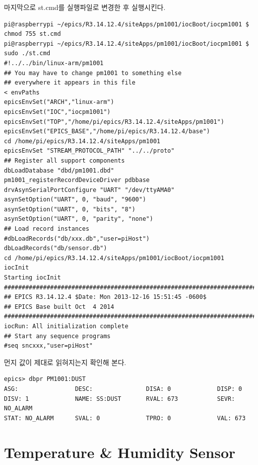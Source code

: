\documentclass[11pt
  , a4paper
  , article
  , oneside
]{memoir}
\begin{document}
마지막으로 st.cmd를 실행파일로 변경한 후 실행시킨다.
\begin{lstlisting}[style=termstyle]
pi@raspberrypi ~/epics/R3.14.12.4/siteApps/pm1001/iocBoot/iocpm1001 $ chmod 755 st.cmd
pi@raspberrypi ~/epics/R3.14.12.4/siteApps/pm1001/iocBoot/iocpm1001 $ sudo ./st.cmd
#!../../bin/linux-arm/pm1001
## You may have to change pm1001 to something else
## everywhere it appears in this file
< envPaths
epicsEnvSet("ARCH","linux-arm")
epicsEnvSet("IOC","iocpm1001")
epicsEnvSet("TOP","/home/pi/epics/R3.14.12.4/siteApps/pm1001")
epicsEnvSet("EPICS_BASE","/home/pi/epics/R3.14.12.4/base")
cd /home/pi/epics/R3.14.12.4/siteApps/pm1001
epicsEnvSet "STREAM_PROTOCOL_PATH" "../../proto"
## Register all support components
dbLoadDatabase "dbd/pm1001.dbd"
pm1001_registerRecordDeviceDriver pdbbase
drvAsynSerialPortConfigure "UART" "/dev/ttyAMA0"
asynSetOption("UART", 0, "baud", "9600")
asynSetOption("UART", 0, "bits", "8")
asynSetOption("UART", 0, "parity", "none")
## Load record instances
#dbLoadRecords("db/xxx.db","user=piHost")
dbLoadRecords("db/sensor.db")
cd /home/pi/epics/R3.14.12.4/siteApps/pm1001/iocBoot/iocpm1001
iocInit
Starting iocInit
############################################################################
## EPICS R3.14.12.4 $Date: Mon 2013-12-16 15:51:45 -0600$
## EPICS Base built Oct  4 2014
############################################################################
iocRun: All initialization complete
## Start any sequence programs
#seq sncxxx,"user=piHost"
\end{lstlisting}
먼지 값이 제대로 읽혀지는지 확인해 본다.
\begin{lstlisting}[style=termstyle]
epics> dbpr PM1001:DUST
ASG:                DESC:               DISA: 0             DISP: 0             
DISV: 1             NAME: SS:DUST       RVAL: 673           SEVR: NO_ALARM      
STAT: NO_ALARM      SVAL: 0             TPRO: 0             VAL: 673
\end{lstlisting}
\section{Temperature \& Humidity Sensor}
\end{document}
